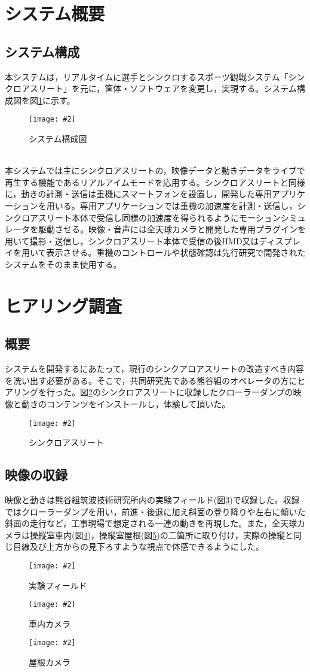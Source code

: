 \documentclass[a4paper,12pt]{jsarticle}
\newcommand{\figuref}[1]{図\ref{#1}}
\newcommand{\fig}[4][width=\textwidth]{
    \begin{figure}[!h]
    \begin{center}
    \texttt{[image: \#2]}
    \caption{#3}
    \label{#4}
    \vspace*{-1cm}
    \end{center}
    \end{figure}
}
\begin{document}
\clearpage

\section{システム概要}
\subsection{システム構成}
本システムは，リアルタイムに選手とシンクロするスポーツ観戦システム「シンクロアスリート」\cite{synchro}を元に，筐体・ソフトウェアを変更し，実現する。システム構成図を\figuref{sys_config}に示す。
\fig{image/sys_config.png}{システム構成図}{sys_config}
\\

本システムでは主にシンクロアスリートの，映像データと動きデータをライブで再生する機能であるリアルアイムモードを応用する。シンクロアスリートと同様に，動きの計測・送信は重機にスマートフォンを設置し，開発した専用アプリケーションを用いる。専用アプリケーションでは重機の加速度を計測・送信し，シンクロアスリート本体で受信し同様の加速度を得られるようにモーションシミュレータを駆動させる。映像・音声には全天球カメラと開発した専用プラグインを用いて撮影・送信し，シンクロアスリート本体で受信の後HMD又はディスプレイを用いて表示させる。重機のコントロールや状態確認は先行研究で開発されたシステム\cite{kumagai_mujin}をそのまま使用する。

\clearpage

\section{ヒアリング調査}
\subsection{概要}
システムを開発するにあたって，現行のシンクアロアスリートの改造すべき内容を洗い出す必要がある。そこで，共同研究先である熊谷組のオペレータの方にヒアリングを行った。\figuref{synchro_image}のシンクロアスリートに収録したクローラーダンプの映像と動きのコンテンツをインストールし，体験して頂いた。
\fig[width=9cm]{image/synchro_image.jpg}{シンクロアスリート}{synchro_image}

\subsection{映像の収録}
映像と動きは熊谷組筑波技術研究所内の実験フィールド(\figuref{test_field})で収録した。収録ではクローラーダンプを用い，前進・後退に加え斜面の登り降りや左右に傾いた斜面の走行など，工事現場で想定される一連の動きを再現した。また，全天球カメラは操縦室車内(\figuref{inside_camera})，操縦室屋根(\figuref{outside_camera})の二箇所に取り付け，実際の操縦と同じ目線及び上方からの見下ろすような視点で体感できるようにした。
\fig[width=7cm]{image/test_field.jpg}{実験フィールド}{test_field}
\fig[width=7cm]{image/inside_camera.png}{車内カメラ}{inside_camera}
\fig[width=7cm]{image/outside_camera.jpg}{屋根カメラ}{outside_camera}
\end{document}

